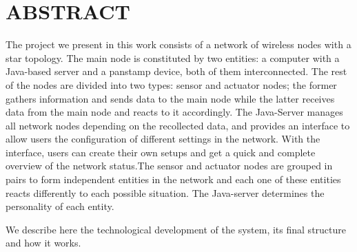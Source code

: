 \section{ABSTRACT}
The project we present in this work consists of a network of wireless nodes with a star topology. The main node is constituted by two entities: a computer with a Java-based server and a panstamp device, both of them interconnected. The rest of the nodes are divided into two types: sensor and actuator nodes; the former gathers information and sends data to the main node while the latter receives data from the main node and reacts to it accordingly. The Java-Server manages all network nodes depending on the recollected data, and provides an interface to allow users the configuration of different settings in the network. With the interface, users can create their own setups and get a quick and complete overview of the network status.The sensor and actuator nodes are grouped in pairs to form independent entities in the network and each one of these entities reacts differently to each possible situation. The Java-server determines the personality of each entity. 
 
We describe here the technological development of the system, its final structure and how it works. 